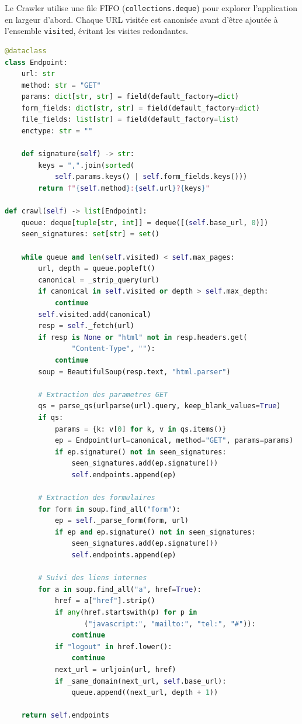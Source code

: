\documentclass[12pt,a4paper]{report}
\newcommand{\code}[1]{\texttt{#1}}
\begin{document}
Le Crawler utilise une file FIFO (\code{collections.deque}) pour explorer l'application en
largeur d'abord. Chaque URL visitée est canonisée avant d'être ajoutée à l'ensemble
\code{visited}, évitant les visites redondantes.

\begin{lstlisting}[language=python, caption={Algorithme BFS complet du Crawler}]
@dataclass
class Endpoint:
    url: str
    method: str = "GET"
    params: dict[str, str] = field(default_factory=dict)
    form_fields: dict[str, str] = field(default_factory=dict)
    file_fields: list[str] = field(default_factory=list)
    enctype: str = ""

    def signature(self) -> str:
        keys = ",".join(sorted(
            self.params.keys() | self.form_fields.keys()))
        return f"{self.method}:{self.url}?{keys}"

def crawl(self) -> list[Endpoint]:
    queue: deque[tuple[str, int]] = deque([(self.base_url, 0)])
    seen_signatures: set[str] = set()

    while queue and len(self.visited) < self.max_pages:
        url, depth = queue.popleft()
        canonical = _strip_query(url)
        if canonical in self.visited or depth > self.max_depth:
            continue
        self.visited.add(canonical)
        resp = self._fetch(url)
        if resp is None or "html" not in resp.headers.get(
                "Content-Type", ""):
            continue
        soup = BeautifulSoup(resp.text, "html.parser")

        # Extraction des parametres GET
        qs = parse_qs(urlparse(url).query, keep_blank_values=True)
        if qs:
            params = {k: v[0] for k, v in qs.items()}
            ep = Endpoint(url=canonical, method="GET", params=params)
            if ep.signature() not in seen_signatures:
                seen_signatures.add(ep.signature())
                self.endpoints.append(ep)

        # Extraction des formulaires
        for form in soup.find_all("form"):
            ep = self._parse_form(form, url)
            if ep and ep.signature() not in seen_signatures:
                seen_signatures.add(ep.signature())
                self.endpoints.append(ep)

        # Suivi des liens internes
        for a in soup.find_all("a", href=True):
            href = a["href"].strip()
            if any(href.startswith(p) for p in
                   ("javascript:", "mailto:", "tel:", "#")):
                continue
            if "logout" in href.lower():
                continue
            next_url = urljoin(url, href)
            if _same_domain(next_url, self.base_url):
                queue.append((next_url, depth + 1))

    return self.endpoints
\end{lstlisting}
\end{document}
